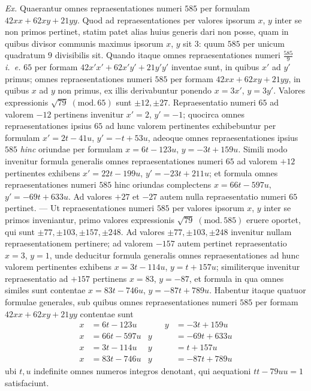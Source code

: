 \textit{Ex.} Quaerantur omnes repraesentationes numeri $585$ per formulam
$42xx+62xy+21yy$. Quod ad repraesentationes per valores ipsorum $x$, $y$ inter se non primos pertinet, statim patet alias huius generis dari non posse, quam in quibus divisor communis maximus ipsorum $x$, $y$ sit $3$: quum $585$ per unicum quadratum $9$ divisibilis sit. Quando itaque omnes repraesentationes numeri $\frac{585}{9}$ \textit{i.~e.} $65$ per formam $42x'x'+62x'y'+21y'y'$ inventae sunt, in quibus $x'$ ad $y'$ primus; omnes repraesentationes numeri $585$ per formam $42xx+62xy+21yy$, in quibus $x$ ad $y$ non primus, ex illis derivabuntur ponendo $x=3x'$, $y=3y'$. Valores expressionis $\sqrt{79}\;(\mathrm{mod.}\,65)$ sunt $\pm12,\pm27$. Repraesentatio numeri $65$ ad valorem $-12$ pertinens invenitur $x'=2$, $y'=-1$; quocirca omnes repraesentationes ipsius $65$ ad hunc valorem pertinentes exhibebuntur per formulam $x'=2t-41u$, $y'=-t+53u$, adeoque omnes repraesentationes ipsius $585$ \textit{hinc} oriundae per formulam $x=6t-123u$, $y=-3t+159u$. Simili modo invenitur formula generalis omnes repraesentationes numeri $65$ ad valorem $+12$ pertinentes exhibens $x'=22t-199u$, $y'=-23t+211u$; et formula omnes repraesentationes numeri $585$ hinc oriundas complectens $x=66t-597u$, $y'=-69t+633u$. Ad valores $+27$ et $-27$ autem nulla repraesentatio numeri $65$ pertinet. --- Ut repraesentationes numeri $585$ per valores ipsorum $x$, $y$ inter se primos inveniantur, primo valores expressionis $\sqrt{79}\;(\mathrm{mod.}\,585)$ eruere oportet, qui sunt $\pm77,\pm103,\pm157,\pm248$. Ad valores $\pm77,\pm103,\pm248$ invenitur nullam repraesentationem pertinere; ad valorem $-157$ autem pertinet repraesentatio $x=3$, $y=1$, unde deducitur formula generalis omnes repraesentationes ad hunc valorem pertinentes exhibens $x=3t-114u$, $y=t+157u$; similiterque invenitur repraesentatio ad $+157$ pertinens $x=83$, $y=-87$, et formula in qua omnes similes sunt contentae $x=83t-746u$, $y=-87t+789u$. Habentur itaque quatuor formulae generales, sub quibus omnes repraesentationes numeri $585$ per formam $42xx+62xy+21yy$ contentae sunt
\[
\begin{aligned}
x&=6t-123u&\qquad y&=-3t+159u\\
x&=66t-597u& y&=-69t+633u\\
x&=3t-114u& y&=t+157u\\
x&=83t-746u& y&=-87t+789u
\end{aligned}
\]
ubi $t,u$ indefinite omnes numeros integros denotant, qui aequationi $tt-79uu=1$ satisfaciunt.


